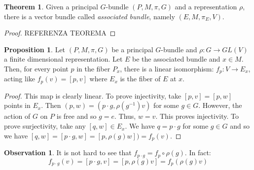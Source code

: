 \documentclass[12pt,a4paper]{report}
\theoremstyle{definition}
\theoremstyle{Theorem}
\newtheorem{Theo}[Def]{Theorem}
\newtheorem{Prop}[Def]{Proposition}
\theoremstyle{definition}
\theoremstyle{definition}
\newtheorem{Obs}[Def]{Observation}
\begin{document}
	\begin{Theo}
		Given a principal $G$-bundle $(P,M,\pi,G)$ and a representation $\rho$, there is a vector bundle called \textit{associated bundle}, namely $(E,M,\pi_E,V)$.
	\end{Theo}
	\begin{proof}
		\begin{comment}
			The proof follows from proposition \ref{Prop_6.1.1}. In fact the principal bundle is locally trivial and this implies that the associated bundle is locally trivial as well, with fiber $V$
		\end{comment}
		REFERENZA TEOREMA
	\end{proof}
	\begin{Prop}\label{Prop_6.2.2}
		Let $(P,M,\pi,G)$ be a principal $G$-bundle and $\rho:G\rightarrow GL(V)$ a finite dimensional representation. Let $E$ be the associated bundle and $x\in M$. Then, for every point $p$ in the fiber $P_x$, there is a linear isomorphism:
		$f_p:V\rightarrow E_x$, acting like $f_p(v)=[p,v]$ where $E_x$ is the fiber of $E$ at $x$.
	\end{Prop}
	\begin{proof}
		This map is clearly linear. To prove injectivity, take $[p,v]=[p,w]$ points in $E_x$. Then $(p,w)=(p\cdot g,\rho(g^{-1})v)$ for some $g\in G$. However, the action of $G$ on $P$ is free and so $g=e$. Thus, $w=v$. This proves injectivity. To prove surjectivity, take any $[q,w]\in E_x$. We have $q=p\cdot g$ for some $g\in G$ and so we have $[q,w]=[p\cdot g,w]=[p,\rho(g)w])=f_p(v)$.
	\end{proof}
	\begin{Obs}\label{Obs_6.2.3}
		It is not hard to see that $f_{p\cdot g}=f_p\circ \rho(g)$. In fact:
		$$f_{p\cdot g}(v)=[p\cdot g,v]=[p,\rho(g)v]=f_p(\rho(g)v)$$
	\end{Obs}
\end{document}
